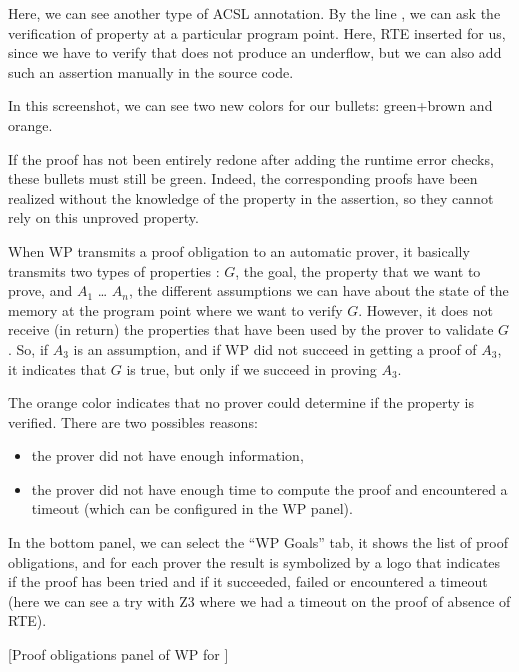 \documentclass[middle]{zmdocument}
\begin{document}
Here, we can see another type of ACSL annotation. By the line
 , we can ask the verification of
property at a particular program point. Here, RTE inserted for us, since
we have to verify that  does not produce an underflow, but
we can also add such an assertion manually in the source code.



In this screenshot, we can see two new colors for our bullets:
green+brown and orange.



If the proof has not been entirely redone after adding the runtime error
checks, these bullets must still be green. Indeed, the corresponding
proofs have been realized without the knowledge of the property in the
assertion, so they cannot rely on this unproved property.



When WP transmits a proof obligation to an automatic prover, it
basically transmits two types of properties : $G$, the goal, the
property that we want to prove, and $A_1$ \ldots{} $A_n$, the
different assumptions we can have about the state of the memory at the
program point where we want to verify $G$. However, it does not
receive (in return) the properties that have been used by the prover to
validate $G$. So, if $A_3$ is an assumption, and if WP did not
succeed in getting a proof of $A_3$, it indicates that $G$ is true,
but only if we succeed in proving $A_3$.



The orange color indicates that no prover could determine if the
property is verified. There are two possibles reasons:



\begin{itemize}
\item the prover did not have enough information,
\item the prover did not have enough time to compute the proof and
  encountered a timeout (which can be configured in the WP panel).
\end{itemize}


In the bottom panel, we can select the ``WP Goals'' tab, it shows the
list of proof obligations, and for each prover the result is symbolized
by a logo that indicates if the proof has been tried and if it
succeeded, failed or encountered a timeout (here we can see a try with
Z3 where we had a timeout on the proof of absence of RTE).


[Proof obligations panel of WP for ]
\end{document}
